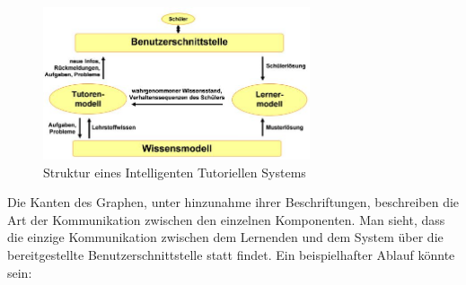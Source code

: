 \begin{figure}[!ht]
	\centering
    \includegraphics[width=0.7\textwidth]{bilder/its_structure.jpg} %
	\caption{Struktur eines Intelligenten Tutoriellen Systems}
\end{figure}


Die Kanten des Graphen, unter hinzunahme ihrer Beschriftungen, beschreiben die Art der
Kommunikation zwischen den einzelnen Komponenten.
Man sieht, dass die einzige Kommunikation zwischen dem Lernenden und dem System über die
bereitgestellte Benutzerschnittstelle statt findet. Ein beispielhafter Ablauf könnte sein:

